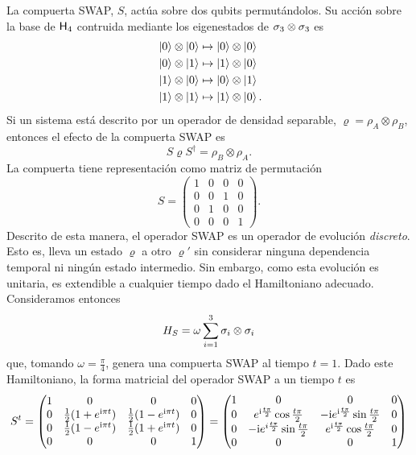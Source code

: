 La compuerta SWAP, $S$, actúa sobre dos qubits permutándolos. Su acción sobre la base de ${\sf H}_{4}$ contruida mediante los eigenestados de $\sigma_{3}\otimes\sigma_{3}$ es
\begin{align*}
    \ket{0}\otimes\ket{0}&\mapsto\ket{0}\otimes\ket{0}\\
    \ket{0}\otimes\ket{1}&\mapsto\ket{1}\otimes\ket{0}\\
    \ket{1}\otimes\ket{0}&\mapsto\ket{0}\otimes\ket{1}\\
    \ket{1}\otimes\ket{1}&\mapsto\ket{1}\otimes\ket{0} \rlap{.}
\end{align*}
Si un sistema está descrito por un operador de densidad separable, $\varrho=\rho_{A}\otimes\rho_{B}$, entonces el efecto de la compuerta SWAP es 
\begin{equation*}
    S\varrho S^{\dag}=\rho_{B}\otimes\rho_{A}.
\end{equation*}
La compuerta tiene representación como matriz de permutación
\begin{equation*}
    S=\begin{pmatrix}
        1&0&0&0\\
        0&0&1&0\\
        0&1&0&0\\
        0&0&0&1
    \end{pmatrix}.
\end{equation*}
Descrito de esta manera, el operador SWAP es un operador de evolución \textit{discreto}. Esto es, lleva un estado $\varrho$ a otro $\varrho'$ sin considerar ninguna dependencia temporal ni ningún estado intermedio. Sin embargo, como esta evolución es unitaria, es extendible a cualquier tiempo dado el Hamiltoniano adecuado. Consideramos entonces
\begin{equation*}
  H_{S}=\omega\sum_{i=1}^{3}\sigma_{i}\otimes\sigma_{i}
\end{equation*}
que, tomando $\omega=\frac{\pi}{4}$, genera una compuerta SWAP al tiempo $t=1$. Dado este Hamiltoniano, la forma matricial del operador \textsc{SWAP} a un tiempo $t$ es
\begin{equation}\label{eq:SWAP(t)}
S^{t}=\begin{pmatrix}
 1 & 0 & 0 & 0 \\
 0 & \frac{1}{2}(1+e^{\text{i} \pi t}) & \frac{1}{2} (1-e^{\text{i} \pi t}) & 0 \\
 0 & \frac{1}{2}(1-e^{\text{i} \pi t}) & \frac{1}{2}(1+e^{\text{i} \pi t}) & 0 \\
 0 & 0 & 0 & 1
\end{pmatrix}=\begin{pmatrix}
  1 & 0 & 0 & 0 \\
  0 & e^{\text{i}\frac{t\pi}{2}}\cos{\frac{t\pi}{2}} & -\text{i} e^{\text{i}\frac{t\pi}{2}}\sin{\frac{t\pi}{2}} & 0 \\
  0 & -\text{i} e^{i\frac{t\pi}{2}}\sin{\frac{t\pi}{2}} & e^{\text{i}\frac{t\pi}{2}}\cos{\frac{t\pi}{2}}  & 0 \\
  0 & 0 & 0 & 1
 \end{pmatrix}
\end{equation}

